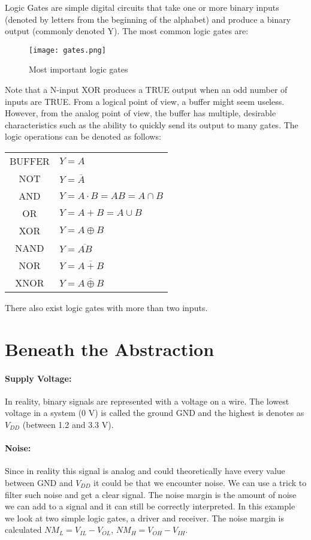 Logic Gates are simple digital circuits that take one or more binary inputs (denoted by letters from the beginning of the alphabet) and 
produce a binary output (commonly denoted Y). The most common logic gates are:

\begin{figure}[h]
    \centering
    \texttt{[image: gates.png]}
    \caption{Most important logic gates}
\end{figure}

Note that a N-input XOR produces a TRUE output when an odd number of inputs are TRUE. From a logical point of view, a buffer 
might seem useless. However, from the analog point of view, the buffer has multiple, desirable characteristics such as the 
ability to quickly send its output to many gates. The logic operations can be denoted as follows:

\begin{center}
    \begin{tabular}{ c  l }
        BUFFER & $Y = A$  \\ 
        NOT & $Y = \overline{A}$  \\ 
        AND & $Y = A \cdot B = AB = A \cap  B$  \\ 
        OR & $Y = A + B = A \cup B $  \\ 
        XOR & $Y = A \oplus B$  \\ 
        NAND & $Y = \overline{AB}$  \\   
        NOR & $Y = \overline{A + B}$ \\
        XNOR & $Y = \overline{A \oplus B}$
    \end{tabular}
\end{center}

There also exist logic gates with more than two inputs.

\section{Beneath the Abstraction}

\paragraph{Supply Voltage:} In reality, binary signals are represented with a voltage on a wire. The lowest
voltage in a system (0 V) is called the ground GND and the highest is denotes as $V_{DD}$ (between 1.2 and 3.3 V).

\paragraph{Noise:} Since in reality this signal is analog and could theoretically have every value between GND and $V_{DD}$ it could
be that we encounter noise. We can use a trick to filter such noise and get a clear signal. The noise margin
is the amount of noise we can add to a signal and it can still be correctly interpreted. In this example we look
at two simple logic gates, a driver and receiver. The noise margin is calculated $NM_L = V_{IL} - V_{OL}$, 
$NM_H = V_{OH} - V_{IH}$.

